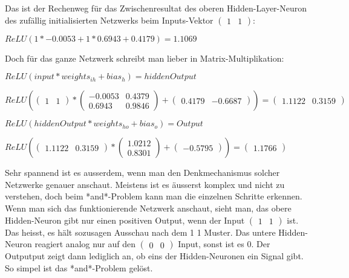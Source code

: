 \documentclass[11pt,a4paper,ngerman]{article}
\begin{document}
Das ist der Rechenweg für das Zwischenresultat des oberen Hidden-Layer-Neuron des zufällig initialisierten Netzwerks beim Inputs-Vektor $\left(\begin{array}{cc} 1 & 1\end{array}\right) $:

\bigskip
    $ ReLU(1 * -0.0053 + 1 * 0.6943 + 0.4179) = 1.1069 $

\bigskip
    Doch für das ganze Netzwerk schreibt man lieber in Matrix-Multiplikation:

\bigskip
$ ReLU(input * weights_{ih} + bias_h) = hiddenOutput $

\bigskip
$ReLU(\left(\begin{array}{cc} 1 & 1\end{array}\right) * \left(\begin{array}{cc} -0.0053 & 0.4379\\ 0.6943 & 0.9846\end{array}\right) + \left(\begin{array}{cc} 0.4179 & -0.6687\end{array}\right)) = \left(\begin{array}{cc} 1.1122 & 0.3159\end{array}\right)$

\bigskip
    $ ReLU(hiddenOutput * weights_{ho} + bias_o) = Output $

\bigskip
$ReLU(\left(\begin{array}{cc} 1.1122 & 0.3159\end{array}\right) * \left(\begin{array}{cc} 1.0212\\ 0.8301\end{array}\right) + \left(\begin{array}{cc} -0.5795\end{array}\right)) = \left(\begin{array}{cc}  1.1766\end{array}\right)$

\bigskip
Sehr spannend ist es ausserdem, wenn man den Denkmechanismus solcher Netzwerke genauer anschaut. Meistens ist es äusserst komplex und nicht zu verstehen, doch beim *and*-Problem kann man die einzelnen Schritte erkennen. Wenn man sich das funktionierende Netzwerk anschaut, sieht man, das obere Hidden-Neuron gibt nur einen positiven Output, wenn der Input $ \left(\begin{array}{cc} 1 & 1\end{array}\right) $ ist. Das heisst, es hält sozusagen Ausschau nach dem 1 1 Muster. Das untere Hidden-Neuron reagiert analog nur auf den $ \left(\begin{array}{cc} 0 & 0\end{array}\right) $ Input, sonst ist es 0. Der Outputput zeigt dann lediglich an, ob eins der Hidden-Neuronen ein Signal gibt. So simpel ist das *and*-Problem gelöst.
\end{document}
